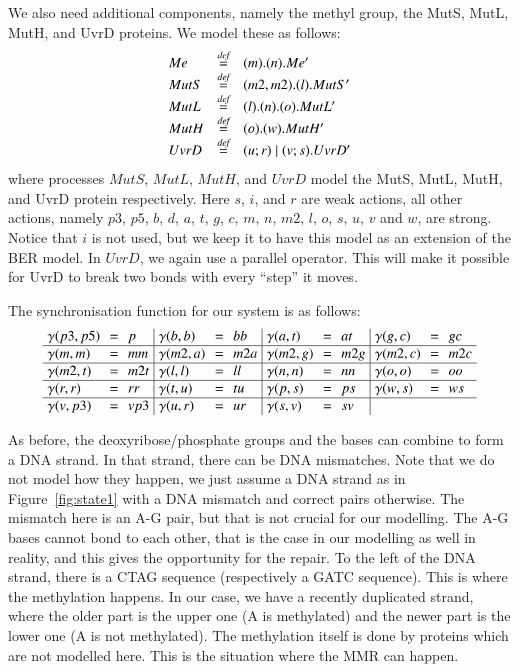 We also need additional components, namely the methyl group, the MutS, MutL, MutH, and UvrD proteins. We model these as follows:
$$\begin{array}{lll}
Me & \stackrel{\emph{def}}{=} & (m).(n).Me'\\
MutS & \stackrel{\emph{def}}{=} & (m2,m2).(l).MutS'\\
MutL & \stackrel{\emph{def}}{=} & (l).(n).(o).MutL'\\
MutH & \stackrel{\emph{def}}{=} & (o).(w).MutH'\\
UvrD & \stackrel{\emph{def}}{=} & (u;r) \; \vert \; (v;s).UvrD'\\
\end{array}$$
%
where processes $MutS$, $MutL$, $MutH$, and $UvrD$ model the MutS, MutL, MutH, and UvrD protein respectively.  Here $s$, $i$, and $r$ are weak actions, all other actions, namely $p3$, $p5$, $b$, $d$, $a$, $t$, $g$, $c$, $m$, $n$, $m2$, $l$, $o$, $s$, $u$, $v$ and $w$, are strong. Notice that $i$ is not used, but we keep it to have this model as an extension of the BER model. In $UvrD$, we again use a  parallel operator. This will make it possible for UvrD to break two bonds with every ``step'' it moves.


The synchronisation function for our system is as follows:
%
\[\arraycolsep=3.4pt\def\arraystretch{1.0}
\begin{array}{ l c l | l c l | l c l | l c l}
\gamma(p3,p5) & = & p & \gamma(b,b) & = & bb & \gamma(a,t) & = & at &  \gamma(g,c) & = & gc \\
\hline
\gamma(m,m) & = & mm & \gamma(m2,a) & = & m2a & \gamma(m2, g) & = & m2g & \gamma(m2,c) & = & m2c \\
\hline
\gamma(m2,t) & = & m2t & \gamma(l,l) & = & ll &\gamma(n,n) & = & nn & \gamma(o,o) & = & oo\\
\hline
\gamma(r,r) & = & rr & \gamma(t,u) & = & tu &\gamma(p,s) & = & ps &\gamma(w,s) & = & ws\\
\hline
\gamma(v,p3) & = & vp3 &  \gamma(u,r) & = & ur  & \gamma(s,v) & = & sv & & & \\
\end{array}
\]

As before, the deoxyribose/phosphate groups and the bases can combine to form a DNA strand. In that strand, there can be DNA mismatches. Note that we do not model how they happen, we just assume a DNA strand as in Figure~\ref{fig:state1} with a DNA mismatch and correct pairs otherwise. The mismatch here is an A-G pair, but that is not crucial for our modelling. The A-G bases cannot bond to each other, that is the case in our modelling as well in reality, and this gives the opportunity for the repair. To the left of the DNA strand, there is a CTAG sequence (respectively a GATC sequence). This is where the methylation happens. In our case, we have a recently duplicated strand, where the older part is the upper one (A is methylated) and the newer part is the lower one (A is not methylated). The methylation itself is done by proteins which are not modelled here. This is the situation where the MMR can happen.

